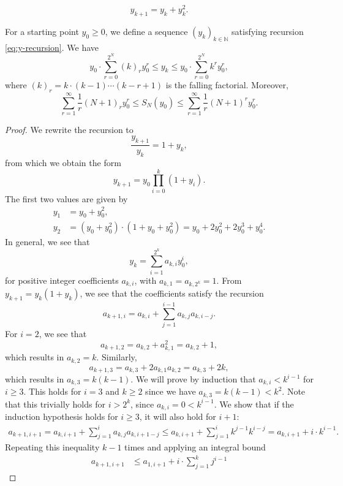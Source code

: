 \documentclass[10pt,a4paper]{amsart}
\begin{document}
\begin{equation}\label{eq:y-recursion}
  y_{k+1}=y_k+y_k^2.
\end{equation}

\begin{lemma}\label{lem:x-seq-sum}
    For a starting point $y_0\ge0$, we define a sequence $(y_k)_{k\in\mathbb N}$ satisfying recursion \eqref{eq:y-recursion}.
    We have
    \[
    y_0\cdot\sum_{r=0}^{2^N}(k)_ry_0^r\le y_k\le y_0\cdot\sum_{r=0}^{2^N}k^ry_0^r,
    \]
    where $(k)_r=k\cdot(k-1)\cdots(k-r+1)$ is the falling factorial.
    Moreover,
    \[
    \sum_{r=1}^\infty \frac{1}{r}(N+1)_ry_0^r \le S_N(y_0)\le \sum_{r=1}^{\infty} \frac{1}{r}(N+1)^ry_0^r.
    \]
\end{lemma}

\begin{proof}
    We rewrite the recursion to
    \[
    \frac{y_{k+1}}{y_k}=1+y_k,
    \]
    from which we obtain the form
    \[
    y_{k+1}=y_0\prod_{i=0}^{k}(1+y_i).
    \]
    The first two values are given by
    \begin{align*}
        y_1&=y_0+y_0^2,\\
        y_2&=(y_0+y_0^2)\cdot(1+y_0+y_0^2)=y_0+2y_0^2+2y_0^3+y_0^4.
    \end{align*}
    In general, we see that
    \[
    y_k=\sum_{i=1}^{2^k}a_{k,i}y_0^i,
    \]
    for positive integer coefficients $a_{k,i}$, with $a_{k,1}=a_{k,2^k}=1$.
    From $y_{k+1}=y_k(1+y_k)$, we see that the coefficients satisfy the recursion
    \[
        a_{k+1,i}=a_{k,i}+\sum_{j=1}^{i-1}a_{k,j}a_{k,i-j}.
    \]
    For $i=2$, we see that
    \[
        a_{k+1,2}=a_{k,2}+a_{k,1}^2=a_{k,2}+1,
    \]
    which results in $a_{k,2}=k$. Similarly,
    \[
        a_{k+1,3}=a_{k,3}+2a_{k,1}a_{k,2}=a_{k,3}+2k,
    \]
    which results in $a_{k,3}=k(k-1)$.
    We will prove by induction that $a_{k,i}< k^{i-1}$ for $i\ge3$. 
    This holds for $i=3$ and $k\ge2$ since we have $a_{k,3}=k(k-1)<k^2$. Note that this trivially holds for $i>2^k$, since $a_{k,i}=0<k^{i-1}$.  We show that if the induction hypothesis holds for $i\ge3$, it will also hold for $i+1$:
    \begin{align*}
        a_{k+1,i+1}
        =a_{k,i+1}+\sum_{j=1}^{i}a_{k,j}a_{k,i+1-j}
        \le a_{k,i+1}+\sum_{j=1}^{i}k^{j-1}k^{i-j}
        =a_{k,i+1}+i\cdot k^{i-1}.
    \end{align*}
    Repeating this inequality $k-1$ times and applying an integral bound
    \begin{eqnarray*}
        a_{k+1,i+1}
        &\le a_{1,i+1}+i\cdot\sum_{j=1}^kj^{i-1}

\end{eqnarray*}
\end{proof}
\end{document}
